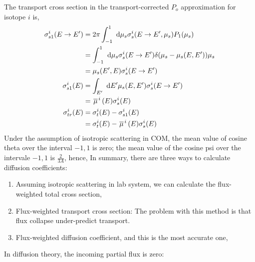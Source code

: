 \documentclass{school-22.211-notes}
\begin{document}
The transport cross section in the transport-corrected $P_o$ approximation for isotope $i$ is, 
\begin{align}
\sigma_{s1}^i (E\to E') &= 2 \pi \int_{-1}^1 \mbox{ }\mathrm{d} \mu_s \sigma_s^i (E\to E', \mu_s) P_1 (\mu_s) \\
&= \int_{-1}^1 \mbox{ }\mathrm{d} \mu_s \sigma_s^i (E \to E') \delta(\mu_s - \mu_s(E,E')) \mu_s \\
&= \mu_s (E', E) \sigma_s^i (E \to E') \\
\sigma_{s1}^i (E) &= \int_{E'} \mbox{ }\mathrm{d} E' \mu_s(E,E') \sigma_s^i (E\to E') \\
&= \left.\overline{\mu} \right.^i (E) \sigma_s^i (E) \\
\sigma_{tr}^i (E) &= \sigma_t^i (E)  - \sigma_{s1}^i (E)  \\
&= \sigma_t^i (E) - \left.\overline{\mu} \right.^i (E) \sigma_s^i (E)
\end{align}
Under the assumption of isotropic scattering in COM, the mean value of cosine theta over the interval $-1,1$ is zero; the mean value of the cosine psi over the intervale $-1,1$ is $\frac{2}{3A}$, hence,
In summary, there are three ways to calculate diffusion coefficients: 
\begin{enumerate}
\item Assuming isotropic scattering in lab system, we can calculate the flux-weighted total cross section,
\item Flux-weighted transport cross section: 
The problem with this method is that flux collapse under-predict transport. 
\item Flux-weighted diffusion coefficient, and this is the most accurate one,


\end{enumerate}


\clearpage
{}
In diffusion theory, the incoming partial flux is zero:
\end{document}
